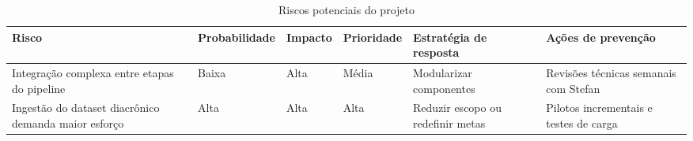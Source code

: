 \begin{table}[htbp]
  \small
  \caption{Riscos potenciais do projeto}          %
  \label{tab:riscos}
  \centering
  \begin{tabularx}{\linewidth}{@{}>{\RaggedRight\arraybackslash}p{4.2cm}
                                    >{\centering\arraybackslash}p{1.9cm}
                                    >{\centering\arraybackslash}p{1.5cm}
                                    >{\centering\arraybackslash}p{1.6cm}
                                    >{\RaggedRight\arraybackslash}p{3.1cm}
                                    >{\RaggedRight\arraybackslash}X@{}}
    \toprule
    Risco & Probabilidade & Impacto & Prioridade & Estratégia de resposta & Ações de prevenção \\ \midrule
    Integração complexa entre etapas do pipeline & Baixa & Alta & Média & Modularizar componentes & Revisões técnicas semanais com Stefan \\[2pt]
    Ingestão do dataset diacrônico demanda maior esforço & Alta & Alta & Alta & Reduzir escopo ou redefinir metas & Pilotos incrementais e testes de carga \\ \bottomrule
  \end{tabularx}
\end{table}
